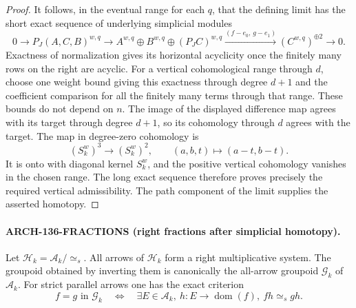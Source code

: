 \begin{proof}
It follows, in the eventual range for each $q$, that the defining
limit has the short exact sequence of underlying simplicial modules
\[
 0\longrightarrow P_J(A,C,B)^{w,q}
 \longrightarrow A^{w,q}\oplus B^{w,q}\oplus(P_J C)^{w,q}
 \xrightarrow{(f-e_0,\,g-e_1)} (C^{w,q})^{\oplus2}
 \longrightarrow0.
\]
Exactness of normalization gives its horizontal acyclicity once
the finitely many rows on the right are acyclic.  For a vertical
cohomological range through $d$, choose one weight bound giving this
exactness through degree $d+1$ and the coefficient comparison for
all the finitely many terms through that range.  These bounds do
not depend on $n$.  The image of the displayed difference map agrees
with its target through degree $d+1$, so its cohomology through $d$
agrees with the target.  The map in degree-zero cohomology is
\[
  (S_k^w)^3\longrightarrow(S_k^w)^2,
  \qquad(a,b,t)\longmapsto(a-t,b-t).
\]
It is onto with diagonal kernel $S_k^w$, and the positive vertical
cohomology vanishes in the chosen range.  The long exact sequence
therefore proves precisely the required vertical admissibility.
The path component of the limit supplies the asserted homotopy.
\end{proof}

\paragraph{ARCH-136-FRACTIONS (right fractions after simplicial homotopy).}
Let $\mathcal H_k=\mathcal A_k/{\simeq_s}$.  All arrows of
$\mathcal H_k$ form a right multiplicative system.  The groupoid
obtained by inverting them is canonically the all-arrow groupoid
$\mathcal G_k$ of $\mathcal A_k$.  For strict parallel arrows one has
the exact criterion
\[
 f=g\text{ in }\mathcal G_k
 \quad\Longleftrightarrow\quad
 \exists E\in\mathcal A_k,\ h:E\to\operatorname{dom}(f),
                         \ fh\simeq_s gh.                 \tag{136.HF}
\]

